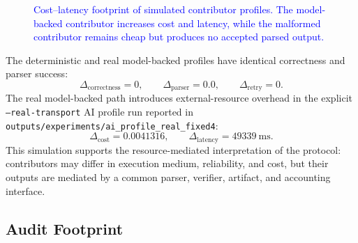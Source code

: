 \documentclass{article}
\theoremstyle{plain}
\begin{document}
\begin{figure}[!htbp]
{{
}
}
\caption{\textcolor{blue}{Cost--latency footprint of simulated contributor profiles. The model-backed contributor increases cost and latency, while the malformed contributor remains cheap but produces no accepted parsed output.}}
\label{fig:cost-latency-footprint}
\end{figure}

The deterministic and real model-backed profiles have identical correctness and
parser success:
\[
  \Delta_{\mathrm{correctness}}=0,\qquad
  \Delta_{\mathrm{parser}}=0.0,\qquad
  \Delta_{\mathrm{retry}}=0.
\]
The real model-backed path introduces external-resource overhead in the explicit
\texttt{--real-transport} AI profile run reported in
\texttt{outputs/experiments/ai\_profile\_real\_fixed4}:
\[
  \Delta_{\mathrm{cost}}=0.0041316,\qquad
  \Delta_{\mathrm{latency}}=49339\ \mathrm{ms}.
\]
This simulation supports the resource-mediated interpretation of the protocol:
contributors may differ in execution medium, reliability, and cost, but their
outputs are mediated by a common parser, verifier, artifact, and accounting
interface.

\FloatBarrier

\subsection{Audit Footprint}
\label{subsec:audit-footprint}
\end{document}
